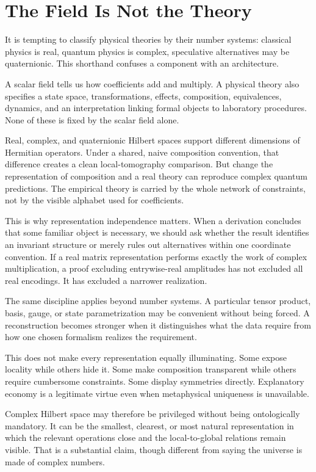 \documentclass[12pt,openany]{book}
\begin{document}
\chapter{The Field Is Not the Theory}
It is tempting to classify physical theories by their number systems: classical physics is real, quantum physics is complex, speculative alternatives may be quaternionic. This shorthand confuses a component with an architecture.

A scalar field tells us how coefficients add and multiply. A physical theory also specifies a state space, transformations, effects, composition, equivalences, dynamics, and an interpretation linking formal objects to laboratory procedures. None of these is fixed by the scalar field alone.

Real, complex, and quaternionic Hilbert spaces support different dimensions of Hermitian operators. Under a shared, naive composition convention, that difference creates a clean local-tomography comparison. But change the representation of composition and a real theory can reproduce complex quantum predictions. The empirical theory is carried by the whole network of constraints, not by the visible alphabet used for coefficients.

This is why representation independence matters. When a derivation concludes that some familiar object is necessary, we should ask whether the result identifies an invariant structure or merely rules out alternatives within one coordinate convention. If a real matrix representation performs exactly the work of complex multiplication, a proof excluding entrywise-real amplitudes has not excluded all real encodings. It has excluded a narrower realization.

The same discipline applies beyond number systems. A particular tensor product, basis, gauge, or state parametrization may be convenient without being forced. A reconstruction becomes stronger when it distinguishes what the data require from how one chosen formalism realizes the requirement.

This does not make every representation equally illuminating. Some expose locality while others hide it. Some make composition transparent while others require cumbersome constraints. Some display symmetries directly. Explanatory economy is a legitimate virtue even when metaphysical uniqueness is unavailable.

Complex Hilbert space may therefore be privileged without being ontologically mandatory. It can be the smallest, clearest, or most natural representation in which the relevant operations close and the local-to-global relations remain visible. That is a substantial claim, though different from saying the universe is made of complex numbers.
\end{document}
